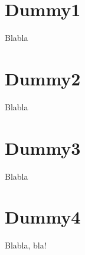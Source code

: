 \documentclass[a4paper,10pt,onecolumn,titlepage]{article}
\begin{document}


\renewcommand\contentsname{Table of Contents}
\tableofcontents

\section{Dummy1}

Blabla

\section{Dummy2}

Blabla

\section{Dummy3}

Blabla

\section{Dummy4}

Blabla, bla!
\end{document}
